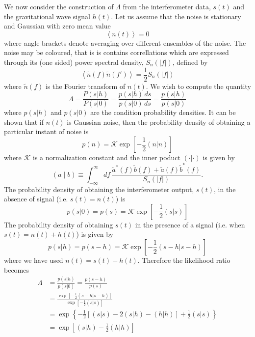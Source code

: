 We now consider the construction of $\Lambda$ from the interferometer data,
$s(t)$ and the gravitational wave signal $h(t)$. Let us assume that the noise
is stationary and Gaussian with zero mean value
\begin{equation}
\left\langle n(t) \right\rangle = 0
\end{equation}
where angle brackets denote averaging over different ensembles of the
noise. The noise may be coloured, that is is contains correllations which are
expressed through its (one sided) power spectral density, $S_n(|f|)$, defined
by
\begin{equation}
\left\langle \tilde{n}(f) \tilde{n}(f') \right\rangle = \frac{1}{2} S_n(|f|)
\label{eq:ospsddef}
\end{equation}
where $\tilde{n}(f)$ is the Fourier transform of $n(t)$. We wish to compute
the quantity
\begin{equation}
\Lambda = \frac{P(s|h)}{P(s|0)} = 
\frac{p(s|h)\,ds}{p(s|0)\,ds} = \frac{p(s|h)}{p(s|0)}
\end{equation}
where $p(s|h)$ and $p(s|0)$ are the condition probability densities.  It can
be shown that if $n(t)$ is Gaussian noise, then the probability density of
obtaining a particular instant of noise is\cite{Finn:1992wt}
\begin{equation}
p(n) = \mathcal{K} \exp\left[-\frac{1}{2} (n|n)\right]
\end{equation}
where $\mathcal{K}$ is a normalization constant and the inner poduct
$(\cdot|\cdot)$ is given by
\begin{equation}
\label{eq:fullinnerproduct}
  (a\mid b) \equiv \int_{-\infty}^\infty df\,
  \frac{\tilde{a}^\ast(f)\tilde{b}(f)+\tilde{a}(f)\tilde{b}^\ast(f)}
       {S_n(|f|)}.
\end{equation}
The probability density of obtaining the interferometer output, $s(t)$, in the
absence of signal (i.e. $s(t) = n(t)$) is
\begin{equation}
p(s|0) = p(s) = \mathcal{K} \exp\left[-\frac{1}{2} (s|s)\right]
\end{equation}
The probability density of obtaining $s(t)$ in the presence of a signal (i.e.
when $s(t) = n(t) + h(t)$) is given by 
\begin{equation}
p(s|h) = p(s-h) = \mathcal{K} \exp\left[-\frac{1}{2} (s-h|s-h)\right]
\end{equation}
where we have used $n(t) = s(t) - h(t)$. Therefore the likelihood ratio
becomes
\begin{equation}
\begin{split}
\Lambda &= \frac{p(s|h)}{p(s|0)} = \frac{p(s-h)}{p(s)} \\
&= \frac{\exp\left[-\frac{1}{2} (s-h|s-h)\right]}{\exp\left[-\frac{1}{2} (s|s)\right]} \\
&= \exp\left\{-\frac{1}{2}\left[(s|s) - 2(s|h) - (h|h)\right] + \frac{1}{2}(s|s)\right\} \\
&= \exp\left[(s|h) - \frac{1}{2}(h|h)\right]
\end{split}
\end{equation}
